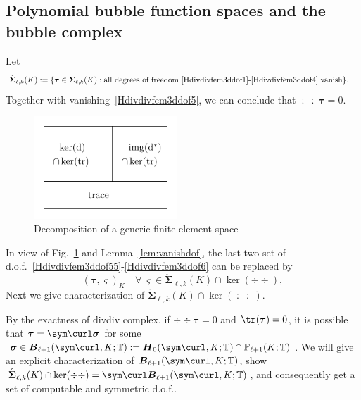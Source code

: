 \subsection{Polynomial bubble function spaces and the bubble complex}\label{sec:bubble}
Let
\begin{align*}
\mathring{\boldsymbol \Sigma}_{\ell,k}(K)&:=\{\boldsymbol  \tau\in\boldsymbol \Sigma_{\ell,k}(K): \textrm{all degrees of freedom~\eqref{Hdivdivfem3ddof1}-\eqref{Hdivdivfem3ddof4} vanish}\}.%
\end{align*}
Together with vanishing~\eqref{Hdivdivfem3ddof5}, we can  conclude that $\div\div \boldsymbol \tau = 0$. 
\begin{figure}[htbp]
\begin{center}
\includegraphics[width=5.4cm]{figures/femspacedecomposition.pdf}
\caption{Decomposition of a generic finite element space}
\label{fig:femdec}
\end{center}
\end{figure}
In view of Fig.~\ref{fig:femdec} and Lemma~\ref{lem:vanishdof}, the last two set of d.o.f.~\eqref{Hdivdivfem3ddof55}-\eqref{Hdivdivfem3ddof6} can be replaced by 
\begin{equation*}%
(\boldsymbol \tau, \boldsymbol \varsigma)_K \quad \forall~\boldsymbol \varsigma\in \mathring{\boldsymbol \Sigma}_{\ell,k}(K) \cap \ker(\div\div),
\end{equation*}
Next we give characterization of $\mathring{\boldsymbol \Sigma}_{\ell,k}(K) \cap \ker(\div\div)$.

By the exactness of divdiv complex, if $\div\div \boldsymbol \tau = 0$ and $\tr(\boldsymbol \tau) = 0$, it is possible that $\boldsymbol \tau = \sym \curl \boldsymbol \sigma$ for some $\boldsymbol \sigma \in \boldsymbol B_{\ell+1}(\sym\curl, K;\mathbb T) : = \boldsymbol H_0(\sym \curl,K; \mathbb T)\cap \mathbb P_{\ell +1}(K;\mathbb T)$. 
We will give an explicit characterization of $\boldsymbol B_{\ell+1}(\sym\curl, K;\mathbb T)$, show $\mathring{\boldsymbol \Sigma}_{\ell,k}(K) \cap \ker(\div\div)= \sym \curl \boldsymbol B_{\ell+1}(\sym\curl, K;\mathbb T)$, and consequently get a set of computable and symmetric d.o.f..


